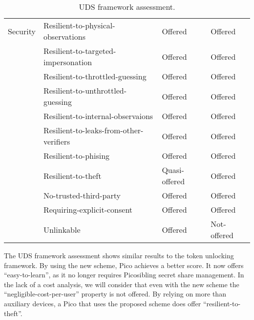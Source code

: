\begin{table}
\begin{tabular}{c|l|l|l}
    Security      & Resilient-to-physical-observations      & \cellcolor{green!25}Offered       	& \cellcolor{green!25}Offered         \\
    ~             & Resilient-to-targeted-impersonation     & \cellcolor{green!25}Offered       	& \cellcolor{green!25}Offered         \\
    ~             & Resilient-to-throttled-guessing         & \cellcolor{green!25}Offered       	& \cellcolor{green!25}Offered         \\
    ~             & Resilient-to-unthrottled-guessing       & \cellcolor{green!25}Offered       	& \cellcolor{green!25}Offered         \\
    ~             & Resilient-to-internal-observaions       & \cellcolor{green!25}Offered       	& \cellcolor{green!25}Offered         \\
    ~             & Resilient-to-leaks-from-other-verifiers & \cellcolor{green!25}Offered       	& \cellcolor{green!25}Offered         \\
    ~             & Resilient-to-phising                    & \cellcolor{green!25}Offered       	& \cellcolor{green!25}Offered         \\
    ~             & Resilient-to-theft                      & \cellcolor{yellow!25}Quasi-offered 	& \cellcolor{green!25}Offered         \\
    ~             & No-trusted-third-party                  & \cellcolor{green!25}Offered       	& \cellcolor{green!25}Offered         \\
    ~             & Requiring-explicit-consent              & \cellcolor{green!25}Offered       	& \cellcolor{green!25}Offered         \\
    ~             & Unlinkable                              & \cellcolor{green!25}Offered       	& \cellcolor{red!25}Not-offered     \\
    \end{tabular}
	
	\caption{UDS framework assessment.}
	\label{table:udsresults}
\end{table}

The UDS framework assessment shows similar results to the token unlocking framework. By using the new scheme, Pico achieves a better score. It now offers ``easy-to-learn'', as it no longer requires Picosibling secret share management. In the lack of a cost analysis, we will consider that even with the new scheme the ``negligible-cost-per-user'' property is not offered. By relying on more than auxiliary devices, a Pico that uses the proposed scheme does offer ``resilient-to-theft''.

